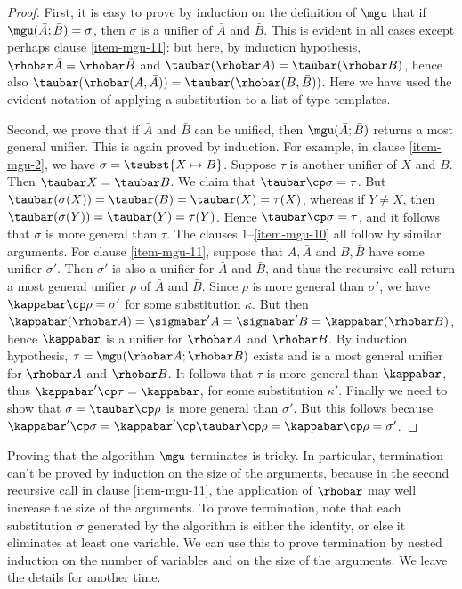 \documentclass[12pt]{article}
\begin{document}
\begin{proof}
  First, it is easy to prove by induction on the definition of $\mgu$
  that if $\mgu(\bar{A};\bar{B})=\sigma$, then $\sigma$ is a unifier
  of $\bar{A}$ and $\bar{B}$. This is evident in all cases except
  perhaps clause \ref{item-mgu-11}: but here, by induction hypothesis,
  $\rhobar\bar{A}=\rhobar\bar{B}$ and $\taubar(\rhobar
  A)=\taubar(\rhobar B)$, hence also
  $\taubar(\rhobar(A,\bar{A}))=\taubar(\rhobar(B,\bar{B}))$. Here we
  have used the evident notation of applying a substitution to a list
  of type templates.
  
  Second, we prove that if $\bar{A}$ and $\bar{B}$ can be unified,
  then $\mgu(\bar{A};\bar{B})$ returns a most general unifier.
  This is again proved by induction. For example, in clause
  \ref{item-mgu-2}, we have $\sigma=\tsubst{X\mapsto B}$. Suppose
  $\tau$ is another unifier of $X$ and $B$.  Then $\taubar X=\taubar
  B$. We claim that $\taubar\cp\sigma=\tau$. But $\taubar(\sigma(X)) =
  \taubar(B) = \taubar(X) = \tau(X)$, whereas if $Y\neq X$, then
  $\taubar(\sigma(Y))=\taubar(Y)=\tau(Y)$. Hence
  $\taubar\cp\sigma=\tau$, and it follows that $\sigma$ is more
  general than $\tau$. The clauses 1--\ref{item-mgu-10} all follow by
  similar arguments.  For clause {\ref{item-mgu-11}}, suppose that
  $A,\bar{A}$ and $B,\bar{B}$ have some unifier $\sigma'$. Then
  $\sigma'$ is also a unifier for $\bar{A}$ and $\bar{B}$, and thus
  the recursive call return a most general unifier $\rho$ of $\bar{A}$
  and $\bar{B}$. Since $\rho$ is more general than $\sigma'$, we have
  $\kappabar\cp\rho=\sigma'$ for some substitution $\kappa$. But then
  $\kappabar(\rhobar A)=\sigmabar' A=\sigmabar' B=\kappabar(\rhobar
  B)$, hence $\kappabar$ is a unifier for $\rhobar A$ and $\rhobar B$.
  By induction hypothesis, $\tau=\mgu(\rhobar A;\rhobar B)$ exists and
  is a most general unifier for $\rhobar A$ and $\rhobar B$. It
  follows that $\tau$ is more general than $\kappabar$, thus
  $\kappabar'\cp\tau = \kappabar$, for some substitution $\kappa'$.
  Finally we need to show that $\sigma=\taubar \cp \rho$ is more
  general than $\sigma'$. But this follows because
  $\kappabar'\cp\sigma = \kappabar'\cp\taubar\cp\rho =
  \kappabar\cp\rho=\sigma'$. \eot
\end{proof}

\begin{remark}
  Proving that the algorithm $\mgu$ terminates is tricky. In
  particular, termination can't be proved by induction on the size of
  the arguments, because in the second recursive call in clause
  \ref{item-mgu-11}, the application of $\rhobar$ may well increase
  the size of the arguments. To prove termination, note that each
  substitution $\sigma$ generated by the algorithm is either the
  identity, or else it eliminates at least one variable. We can use
  this to prove termination by nested induction on the number of
  variables and on the size of the arguments. We leave the details for
  another time.
\end{remark}
\end{document}
